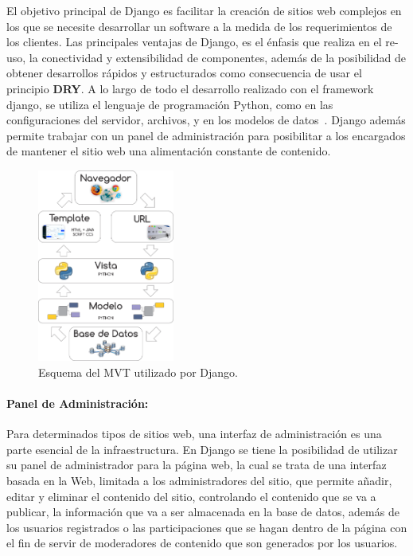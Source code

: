 \documentclass[journal,transmag]{IEEEtran}
\begin{document}
El objetivo principal de Django es facilitar la creación de sitios web complejos en los que se necesite desarrollar un software a la medida de los requerimientos de los clientes. Las principales ventajas de Django, es el énfasis que realiza en el re-uso, la conectividad y extensibilidad de componentes, además de la posibilidad de obtener desarrollos rápidos y estructurados como consecuencia de usar el principio \textbf{DRY}. A lo largo de todo el desarrollo realizado con el framework django, se utiliza el lenguaje de programación Python, como en las configuraciones del servidor, archivos, y en los modelos de datos~\cite{Wik2014}. Django además permite trabajar con un panel de administración para posibilitar a los encargados de mantener el sitio web una alimentación constante de contenido.

\begin{figure}[t]
\centering
\includegraphics[width=0.4\textwidth]{diagrama_MVC.png}
\caption{Esquema del MVT utilizado por Django.}
\label{fig:esq_Django}
\end{figure}

\paragraph{Panel de Administración:}

Para determinados tipos de sitios web, una interfaz de administración es una parte esencial de la infraestructura. En Django se tiene la posibilidad de utilizar su panel de administrador para la página web, la cual se trata de una interfaz basada en la Web, limitada a los administradores del sitio, que permite añadir, editar y eliminar el contenido del sitio, controlando el contenido que se va a publicar, la información que va a ser almacenada en la base de datos, además de los usuarios registrados o las participaciones que se hagan dentro de la página con el fin de servir de moderadores de contenido que son generados por los usuarios. 
\end{document}
